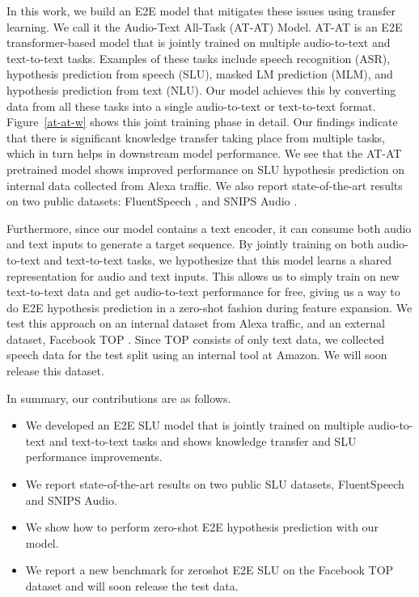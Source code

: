 \documentclass[letterpaper]{article} \usepackage{aaai21}  \usepackage{times}  \usepackage{helvet} \usepackage{courier}  \usepackage[hyphens]{url}  \usepackage{graphicx} \usepackage{booktabs}
\begin{document}
In this work, we build an E2E model that mitigates these issues using transfer learning. We call it the Audio-Text All-Task (AT-AT) Model. AT-AT is an E2E transformer-based model that is jointly trained on multiple audio-to-text and text-to-text tasks. Examples of these tasks include speech recognition (ASR), hypothesis prediction from speech (SLU), masked LM prediction (MLM), and hypothesis prediction from text (NLU). Our model achieves this by converting data from all these tasks into a single audio-to-text or text-to-text format. Figure~\ref{at-at-w} shows this joint training phase in detail. Our findings indicate that there is significant knowledge transfer taking place from multiple tasks, which in turn helps in downstream model performance. We see that the AT-AT pretrained model shows improved performance on SLU hypothesis prediction on internal data collected from Alexa traffic. We also report state-of-the-art results on two public datasets: FluentSpeech \cite{Lugosch2019SpeechMP}, and SNIPS Audio \cite{Saade2018SpokenLU}. 

Furthermore, since our model contains a text encoder, it can consume both audio and text inputs to generate a target sequence. By jointly training on both audio-to-text and text-to-text tasks, we hypothesize that this model learns a shared representation for audio and text inputs. This allows us to simply train on new text-to-text data and get audio-to-text performance for free, giving us a way to do E2E hypothesis prediction in a zero-shot fashion during feature expansion. We test this approach on an internal dataset from Alexa traffic, and an external dataset, Facebook TOP \cite{gupta2018semantic}. Since TOP consists of only text data, we collected speech data for the test split using an internal tool at Amazon. We will soon release this dataset.

In summary, our contributions are as follows.
\begin{itemize}
    \item We developed an E2E SLU model that is jointly trained on multiple audio-to-text and text-to-text tasks and shows knowledge transfer and SLU performance improvements.
    \item We report state-of-the-art results on two public SLU datasets, FluentSpeech and SNIPS Audio.
    \item We show how to perform zero-shot E2E hypothesis prediction with our model.
    \item We report a new benchmark for zeroshot E2E SLU on the Facebook TOP dataset and will soon release the test data.
\end{itemize}
\end{document}
